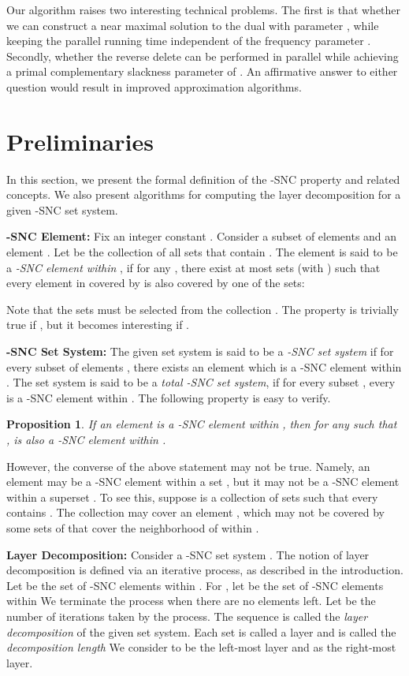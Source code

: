 \documentclass[11pt]{article}
\newtheorem{proposition}[theorem]{\bf Proposition}
\begin{document}
Our algorithm raises two interesting technical problems.
The first is that whether we can construct a near maximal solution to the dual with parameter ,
while keeping the parallel running time independent of the frequency parameter .
Secondly, whether the reverse delete can be performed in parallel while achieving a primal complementary
slackness parameter of . An affirmative answer to either question would result in improved approximation algorithms.

\section{Preliminaries}
In this section, we present the formal definition of the -SNC property and related concepts.
We also present algorithms for computing the layer decomposition for a given -SNC set system.

{\bf -SNC Element: }Fix an integer constant . Consider a subset of elements  and an element .
Let  be the collection of all sets that contain .
The element  is said to be a {\em -SNC element within }, 
if for any ,
there exist at most  sets  (with )
such that every element in  covered by  is also covered by one of the  sets:

Note that the  sets must be selected from the collection .
The property is trivially true if , but it becomes interesting if .

{\bf -SNC Set System: }The given set system  is said to be a {\em -SNC set system}
if for every subset of elements , there exists an element 
which is a -SNC element within . 
The set system is said to be a {\em total -SNC set system},
if for every subset , every  is a -SNC element within .
The following property is easy to verify.

\begin{proposition}
\label{prop:AAA}
If an element  is a -SNC element within , then for any  such that ,
 is also a -SNC element within .
\end{proposition}

However, the converse of the above statement may not be true.
Namely, an element  may be a -SNC element within a set , but it may not be a -SNC element
within a superset . To see this, suppose  is a collection of sets 
such that every  contains .
The collection  may cover an element ,
which may not be covered by some  sets of  that cover the neighborhood of  within .

{\bf Layer Decomposition: }
Consider a -SNC set system .
The notion of layer decomposition is defined via an iterative process, as described in the introduction.
Let  be the set of -SNC elements within .
For , let  be the set of -SNC elements within 
We terminate the process when there are no elements left. Let  be the number of iterations taken by the process.
The sequence  is called the {\em layer decomposition} of the given set system.
Each set  is called a layer and  is called the {\em decomposition length}
We consider  to be the left-most layer and  as the right-most layer.
\end{document}
